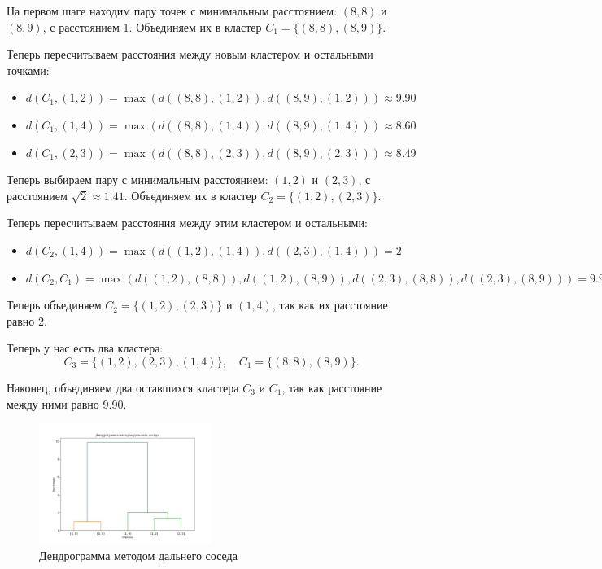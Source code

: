 На первом шаге находим пару точек с минимальным расстоянием: \( (8, 8) \) и \( (8, 9) \), с расстоянием 1. Объединяем их в кластер \( C_1 = \{(8, 8), (8, 9)\} \).

Теперь пересчитываем расстояния между новым кластером и остальными точками:
\begin{itemize}
    \item \( d(C_1, (1, 2)) = \max(d((8, 8), (1, 2)), d((8, 9), (1, 2))) \approx 9.90 \)
    \item \( d(C_1, (1, 4)) = \max(d((8, 8), (1, 4)), d((8, 9), (1, 4))) \approx 8.60 \)
    \item \( d(C_1, (2, 3)) = \max(d((8, 8), (2, 3)), d((8, 9), (2, 3))) \approx 8.49 \)
\end{itemize}

Теперь выбираем пару с минимальным расстоянием: \( (1, 2) \) и \( (2, 3) \), с расстоянием \( \sqrt{2} \approx 1.41 \). Объединяем их в кластер \( C_2 = \{(1, 2), (2, 3)\} \).

Теперь пересчитываем расстояния между этим кластером и остальными:
\begin{itemize}
    \item \( d(C_2, (1, 4)) = \max(d((1, 2), (1, 4)), d((2, 3), (1, 4))) = 2 \)
    \item \( d(C_2, C_1) = \max(d((1, 2), (8, 8)), d((1, 2), (8, 9)), d((2, 3), (8, 8)), d((2, 3), (8, 9))) = 9.90 \)
\end{itemize}

Теперь объединяем \( C_2 = \{(1, 2), (2, 3)\} \) и \( (1, 4) \), так как их расстояние равно 2.

Теперь у нас есть два кластера:
\[
    C_3 = \{(1, 2), (2, 3), (1, 4)\}, \quad C_1 = \{(8, 8), (8, 9)\}.
\]

Наконец, объединяем два оставшихся кластера \( C_3 \) и \( C_1 \), так как расстояние между ними равно 9.90.

\begin{figure}[h!]
    \centering
    \includegraphics[width=0.5\textwidth]{chapters/clustering/images/figure1.jpg} %
    \caption{Дендрограмма методом дальнего соседа}
\end{figure}


